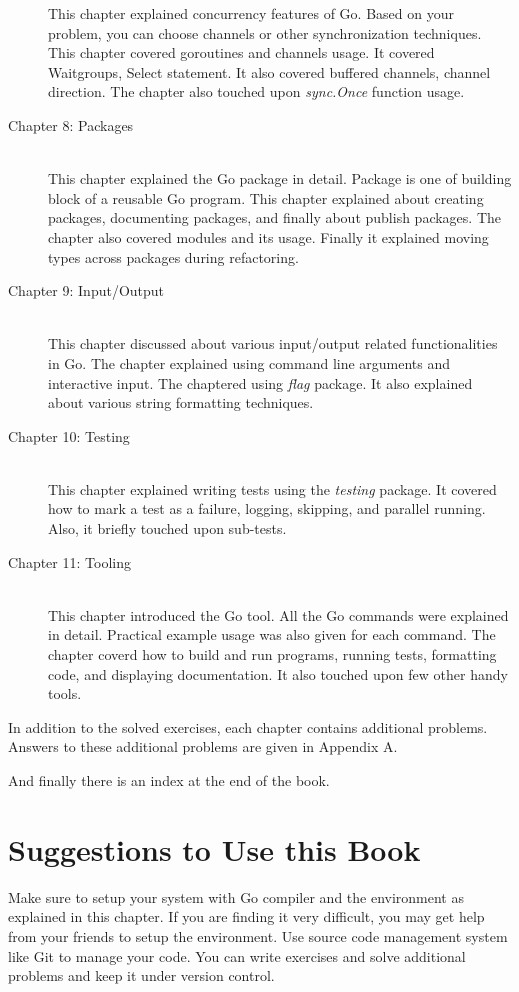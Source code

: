 \begin{description}
This chapter explained concurrency features of Go. Based on your problem, you
can choose channels or other synchronization techniques. This chapter covered
goroutines and channels usage. It covered Waitgroups, Select statement. It also
covered buffered channels, channel direction. The chapter also touched
upon \textit{sync.Once} function usage.
\item[Chapter 8: Packages] \hfill \\
This chapter explained the Go package in detail. Package is one of building
block of a reusable Go program. This chapter explained about creating packages,
documenting packages, and finally about publish packages. The chapter also
covered modules and its usage. Finally it explained moving types across packages
during refactoring.
\item[Chapter 9: Input/Output] \hfill \\
This chapter discussed about various input/output related functionalities in Go.
The chapter explained using command line arguments and interactive input. The
chaptered using \textit{flag} package. It also explained about various string
formatting techniques.
\item[Chapter 10: Testing] \hfill \\
This chapter explained writing tests using the \textit{testing} package. It
covered how to mark a test as a failure, logging, skipping, and parallel
running. Also, it briefly touched upon sub-tests.
\item[Chapter 11: Tooling] \hfill \\
This chapter introduced the Go tool. All the Go commands were explained in
detail. Practical example usage was also given for each command. The chapter
coverd how to build and run programs, running tests, formatting code, and
displaying documentation. It also touched upon few other handy tools.
\end{description}

In addition to the solved exercises, each chapter contains additional problems.
Answers to these additional problems are given in Appendix A.

And finally there is an index at the end of the book.

\section{Suggestions to Use this Book}

Make sure to setup your system with Go compiler and the environment as explained
in this chapter. If you are finding it very difficult, you may get help from
your friends to setup the environment. Use source code management system like
Git to manage your code. You can write exercises and solve additional problems
and keep it under version control.

